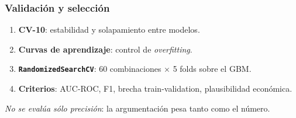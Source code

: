 \begin{frame}
\frametitle{Validación y selección}
\begin{enumerate}
    \item \textbf{CV-10}: estabilidad y solapamiento entre modelos.
    \item \textbf{Curvas de aprendizaje}: control de \textit{overfitting}.
    \item \textbf{\texttt{RandomizedSearchCV}}: 60 combinaciones × 5 folds sobre el GBM.
    \item \textbf{Criterios}: AUC-ROC, F1, brecha train-validation, plausibilidad económica.
\end{enumerate}
\vspace{0.3cm}
\textit{No se evalúa sólo precisión}: la argumentación pesa tanto como el número.
\end{frame}
